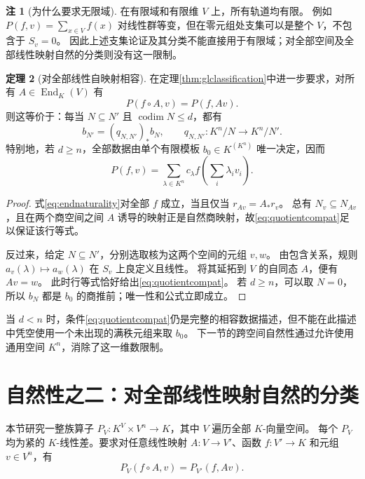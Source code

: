 \documentclass[UTF8,11pt,a4paper]{ctexart}
\theoremstyle{definition}
\newtheorem{theorem}{定理}[section]
\newtheorem{remark}[theorem]{注}
\newcommand{\End}{\operatorname{End}}
\begin{document}
\begin{remark}[为什么要求无限域]
在有限域和有限维 $V$ 上，所有轨道均有限。
例如 $P(f,v)=\sum_{x\in V}f(x)$ 对线性群等变，但在零元组处支集可以是整个 $V$，不包含于 $S_v=0$。
因此上述支集论证及其分类不能直接用于有限域；对全部空间及全部线性映射自然的分类则没有这一限制。
\end{remark}

\begin{theorem}[对全部线性自映射相容]\label{thm:endclassification}
在定理\ref{thm:glclassification}中进一步要求，对所有 $A\in\End_K(V)$ 有
\begin{equation}\label{eq:endnaturality}
 P(f\circ A,v)=P(f,Av).
\end{equation}
则这等价于：每当 $N\subseteq N'$ 且 $\operatorname{codim}N\le d$，都有
\begin{equation}\label{eq:quotientcompat}
 b_{N'}=(q_{N,N'})_*b_N,
 \qquad q_{N,N'}:K^n/N\to K^n/N'.
\end{equation}
特别地，若 $d\ge n$，全部数据由单个有限模板 $b_0\in K^{(K^n)}$ 唯一决定，因而
\[
 P(f,v)=\sum_{\lambda\in K^n}c_\lambda f\left(\sum_i\lambda_iv_i\right).
\]
\end{theorem}
\begin{proof}
式\eqref{eq:endnaturality}对全部 $f$ 成立，当且仅当 $r_{Av}=A_*r_v$。
总有 $N_v\subseteq N_{Av}$，且在两个商空间之间 $A$ 诱导的映射正是自然商映射，故\eqref{eq:quotientcompat}足以保证该行等式。

反过来，给定 $N\subseteq N'$，分别选取核为这两个空间的元组 $v,w$。
由包含关系，规则 $a_v(\lambda)\mapsto a_w(\lambda)$ 在 $S_v$ 上良定义且线性。
将其延拓到 $V$ 的自同态 $A$，便有 $Av=w$。
此时行等式恰好给出\eqref{eq:quotientcompat}。
若 $d\ge n$，可以取 $N=0$，所以 $b_N$ 都是 $b_0$ 的商推前；唯一性和公式立即成立。
\end{proof}

当 $d<n$ 时，条件\eqref{eq:quotientcompat}仍是完整的相容数据描述，但不能在此描述中凭空使用一个未出现的满秩元组来取 $b_0$。
下一节的跨空间自然性通过允许使用通用空间 $K^n$，消除了这一维数限制。

\section{自然性之二：对全部线性映射自然的分类}\label{sec:universal}
本节研究一整族算子 $P_V:K^V\times V^n\to K$，其中 $V$ 遍历全部 $K$-向量空间。
每个 $P_V$ 均为紧的 $K$-线性差。要求对任意线性映射 $A:V\to V'$、函数 $f:V'\to K$ 和元组 $v\in V^n$，有
\begin{equation}\label{eq:functorial}
 P_V(f\circ A,v)=P_{V'}(f,Av).
\end{equation}
\end{document}
